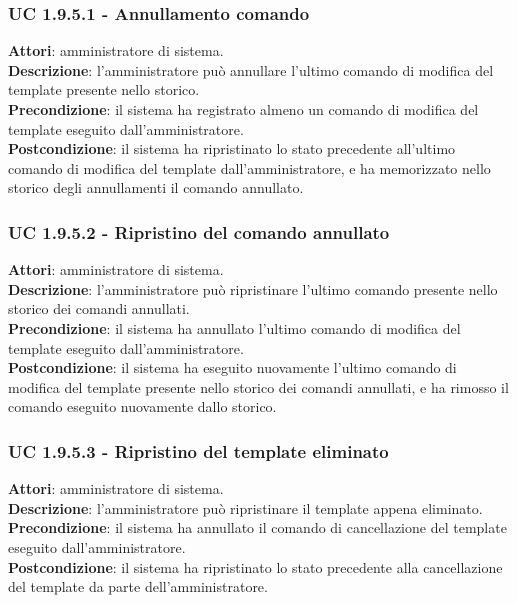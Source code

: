 \subsubsection{UC 1.9.5.1 - Annullamento comando}{
	\label{uc1.9.5.1}
	\textbf{Attori}: amministratore di sistema. \\
	\textbf{Descrizione}: l'amministratore può annullare l'ultimo comando di modifica del template presente nello storico. \\
	\textbf{Precondizione}: il sistema ha registrato almeno un comando di modifica del template eseguito dall'amministratore.	\\
	\textbf{Postcondizione}: il sistema ha ripristinato lo stato precedente all'ultimo comando di modifica del template dall'amministratore, e ha memorizzato nello storico degli	annullamenti il comando annullato.	\\
	}
\subsubsection{UC 1.9.5.2 - Ripristino del comando annullato}{
	\label{uc1.9.5.2}
	\textbf{Attori}: amministratore di sistema. \\
	\textbf{Descrizione}: l'amministratore può ripristinare l'ultimo comando presente nello	storico dei comandi annullati. \\
	\textbf{Precondizione}: il sistema ha annullato l'ultimo comando di modifica del template
	eseguito dall'amministratore.	\\
	\textbf{Postcondizione}: il sistema ha eseguito nuovamente l'ultimo comando di modifica	del template presente nello storico dei comandi annullati, e ha rimosso il comando eseguito nuovamente dallo storico.	\\
	}
\subsubsection{UC 1.9.5.3 - Ripristino del template eliminato}{
	\label{uc1.9.5.3}
	\textbf{Attori}: amministratore di sistema. \\
	\textbf{Descrizione}: l'amministratore può ripristinare il template appena eliminato. \\
	\textbf{Precondizione}: il sistema ha annullato il comando di cancellazione del template eseguito dall'amministratore.	\\
	\textbf{Postcondizione}: il sistema ha ripristinato lo stato precedente alla cancellazione del template da parte dell'amministratore.	\\
	}